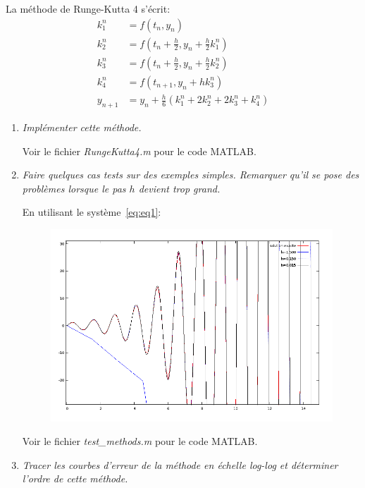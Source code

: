 \documentclass[a4paper,10pt]{article}
\begin{document}
La méthode de Runge-Kutta 4 s'écrit:
\begin{align}\nonumber
    k_1^n & = f(t_n, y_n) \\\nonumber
    k_2^n & = f(t_n + \frac{h}{2}, y_n + \frac{h}{2} k_1^n) \\
    k_3^n & = f(t_n + \frac{h}{2}, y_n + \frac{h}{2} k_2^n) \\\nonumber
    k_4^n & = f(t_{n + 1}, y_n + h k_3^n) \\\nonumber
    y_{n + 1} & = y_n + \frac{h}{6}(k_1^n + 2 k_2^n + 2k_3^n + k_4^n)
\end{align}

\begin{enumerate}
    \item \emph{Implémenter cette méthode.}

    Voir le fichier \emph{RungeKutta4.m} pour le code MATLAB.
\clearpage
    \item \emph{Faire quelques cas tests sur des exemples simples. Remarquer qu'il se
    pose des problèmes lorsque le pas $h$ devient trop grand.}

    En utilisant le système~\eqref{eq:eq1}:
\begin{figure}[h!]
    \centering
    \includegraphics[scale=0.6]{./img/step-runge-kutta.png}
\end{figure}

    Voir le fichier \emph{test\_methods.m} pour le code MATLAB.

    \item \emph{Tracer les courbes d'erreur de la méthode en échelle log-log et
    déterminer l'ordre de cette méthode.}


\end{enumerate}
\end{document}
